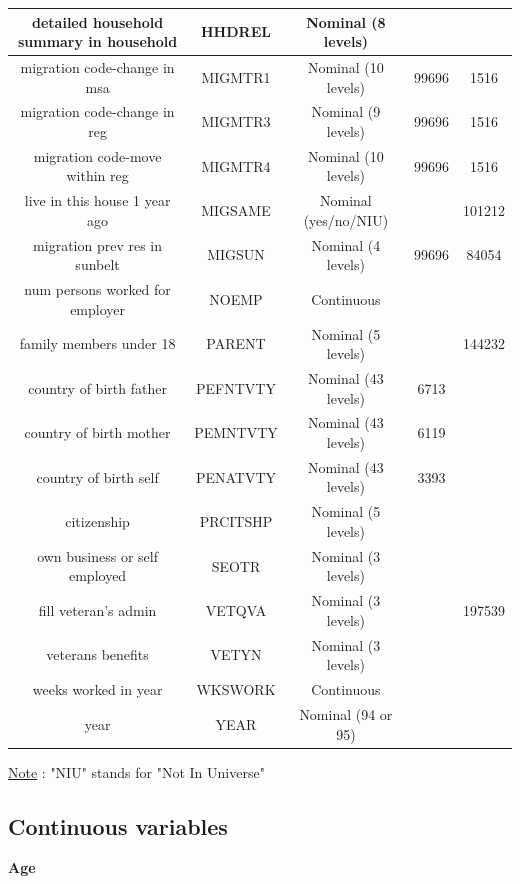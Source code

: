 \documentclass{article}
\begin{document}
\begin{center}
\begin{tabular}{|c|c|c|c|c|}
\hline
 detailed household summary in household & HHDREL & Nominal (8 levels) & &\\
\hline
 migration code-change in msa & MIGMTR1 & Nominal (10 levels) & 99696 & 1516\\
\hline
 migration code-change in reg & MIGMTR3 & Nominal (9 levels) & 99696 & 1516\\
\hline
 migration code-move within reg & MIGMTR4 & Nominal (10 levels) & 99696 & 1516\\
\hline
 live in this house 1 year ago & MIGSAME & Nominal (yes/no/NIU) & & 101212\\
\hline
 migration prev res in sunbelt & MIGSUN & Nominal (4 levels) & 99696 & 84054\\
\hline
 num persons worked for employer & NOEMP & Continuous & &\\
\hline
 family members under 18 & PARENT & Nominal (5 levels) & & 144232\\
\hline
 country of birth father & PEFNTVTY & Nominal (43 levels) & 6713 &\\
\hline
 country of birth mother & PEMNTVTY & Nominal (43 levels) & 6119 &\\
\hline
 country of birth self & PENATVTY & Nominal (43 levels) & 3393 &\\
\hline
 citizenship & PRCITSHP & Nominal (5 levels) & & \\
\hline
 own business or self employed & SEOTR & Nominal (3 levels) & &\\
\hline
fill veteran's admin & VETQVA & Nominal (3 levels) & & 197539\\
\hline
veterans benefits &	VETYN & Nominal (3 levels) & &\\
\hline
weeks worked in year & WKSWORK & Continuous & & \\
\hline
year & YEAR & Nominal (94 or 95) & & \\
\hline
\end{tabular}
\end{center}
\vspace{0.3cm}
\noindent \underline{Note} : "NIU" stands for "Not In Universe"
\newpage
\subsection{Continuous variables}
\textbf{Age}\\
\end{document}
